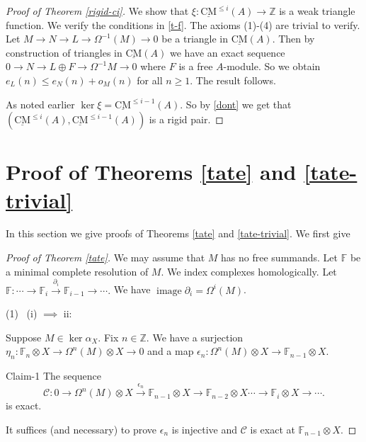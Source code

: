 \documentclass{amsart}
\newcommand{\Z}{\mathbb{Z} }
\newcommand{\Fb}{\mathbb{F} }
\newcommand{\rt}{\rightarrow}
\newcommand{\image}{\operatorname{image}}
\newcommand{\CMS}{\operatorname{\underline{CM}}}
\theoremstyle{plain}
\theoremstyle{definition}
\theoremstyle{remark}
\begin{document}
{\begin{proof}[Proof of Theorem \ref{rigid-ci}]
We show that $\xi \colon \CMS^{\leq i}(A) \rt \Z$ is a weak triangle function. We verify the conditions in \ref{t-f}.
The axioms (1)-(4) are trivial to verify.
Let $M \rt N \rt L \rt \Omega^{-1}(M) \rt 0$ be a triangle in $\CMS(A)$. Then by construction of triangles in $\CMS(A)$ we have an exact sequence $0 \rt N \rt L \oplus F \rt \Omega^{-1}M \rt 0$ where $F$ is a free $A$-module. So we obtain $e_L(n) \leq e_N(n) + o_M(n)$ for all $n \geq 1$. The result follows.

As noted earlier $\ker \xi = \CMS^{\leq i-1}(A)$. So by \ref{dont} we get that \\ $(\CMS^{\leq i}(A), \CMS^{\leq i-1}(A))$ is a rigid pair.
\end{proof}






















\section{Proof of Theorems \ref{tate} and \ref{tate-trivial}}
In this section we give proofs of Theorems \ref{tate} and \ref{tate-trivial}.
We first give
\begin{proof}[Proof of Theorem \ref{tate}]
We may assume that $M$ has no free summands. Let $\Fb$ be a minimal complete resolution of $M$. We index complexes homologically.
Let $\Fb \colon \cdots \rt \Fb_i \xrightarrow{\partial_i} \Fb_{i-1} \rt \cdots.$ We have $\image \partial_i = \Omega^i(M)$.

(1) \
(i) $\implies$ ii:

 Suppose $M \in \ker \alpha_X$. Fix $n \in \Z$. We have a surjection $\eta_n \colon \Fb_{n}\otimes X \rt \Omega^n(M) \otimes X \rt 0$ and a map $\epsilon_n \colon \Omega^n(M) \otimes X \rt \Fb_{n-1}\otimes X $.

Claim-1  The sequence
$$\mathcal{C} \colon  0 \rt  \Omega^n(M) \otimes X  \xrightarrow{\epsilon_n} \Fb_{n-1}\otimes X \rt \Fb_{n-2}\otimes X   \cdots  \rt \Fb_{i}\otimes X \rt \cdots.$$
is exact.

It suffices (and necessary) to prove $\epsilon_n$ is injective and $\mathcal{C}$ is exact at $\Fb_{n-1}\otimes X$.


\end{proof}}
\end{document}
